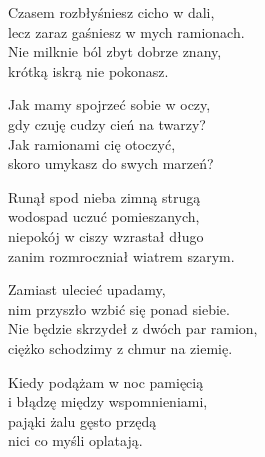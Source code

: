 \begin{text}
Czasem rozbłyśniesz cicho w dali,\\
lecz zaraz gaśniesz w mych ramionach.\\
Nie milknie ból zbyt dobrze znany,\\
krótką iskrą nie pokonasz.

Jak mamy spojrzeć sobie w oczy,\\
gdy czuję cudzy cień na twarzy?\\
Jak ramionami cię otoczyć,\\
skoro umykasz do swych marzeń?

Runął spod nieba zimną strugą\\
wodospad uczuć pomieszanych,\\
niepokój w ciszy wzrastał długo\\
zanim rozmroczniał wiatrem szarym.

Zamiast ulecieć upadamy,\\
nim przyszło wzbić się ponad siebie.\\
Nie będzie skrzydeł z dwóch par ramion,\\
ciężko schodzimy z chmur na ziemię.

Kiedy podążam w noc pamięcią\\
i błądzę między wspomnieniami,\\
pająki żalu gęsto przędą\\
nici co myśli oplatają.
\end{text}
\begin{chord}

\end{chord}